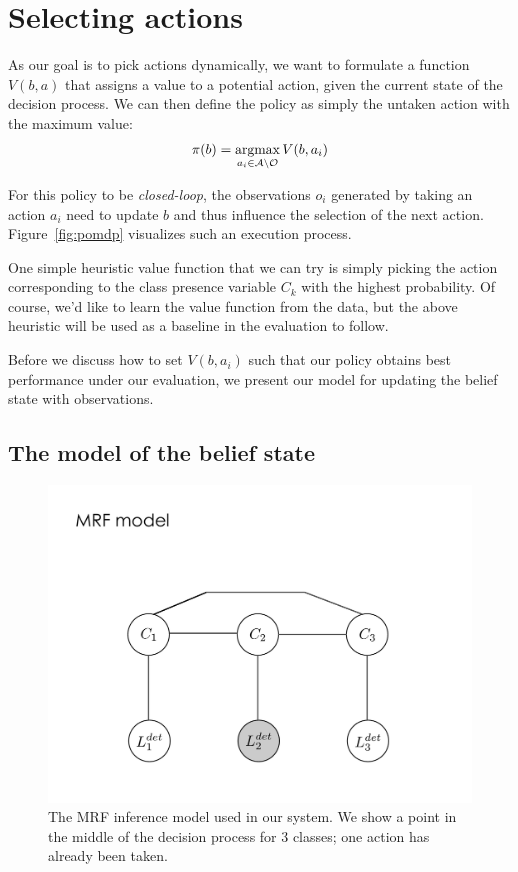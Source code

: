 \section{Selecting actions} \label{sec:value}
As our goal is to pick actions dynamically, we want to formulate a function $V(b,a)$  that assigns a value to a potential action, given the current state of the decision process.
We can then define the policy as simply the untaken action with the maximum value:
\begin{align}
\pi(b) = \argmax_{a_i \in \mathcal{A} \setminus \mathcal{O}} V(b,a_i)
\end{align}

For this policy to be \emph{closed-loop}, the observations $o_i$ generated by taking an action $a_i$ need to update $b$ and thus influence the selection of the next action.
Figure~\ref{fig:pomdp} visualizes such an execution process.

One simple heuristic value function that we can try is simply picking the action corresponding to the class presence variable $C_k$ with the highest probability.
Of course, we'd like to learn the value function from the data, but the above heuristic will be used as a baseline in the evaluation to follow.

Before we discuss how to set $V(b,a_i)$ such that our policy obtains best performance under our evaluation, we present our model for updating the belief state with observations.

\subsection{The model of the belief state}
\begin{figure}[h!]
\centering
\includegraphics[width=0.56\linewidth]{figures/inf_model_mrf_1.pdf}
\caption{
The MRF inference model used in our system.
We show a point in the middle of the decision process for 3 classes; one action has already been taken.
}
\label{fig:model}
\end{figure}

